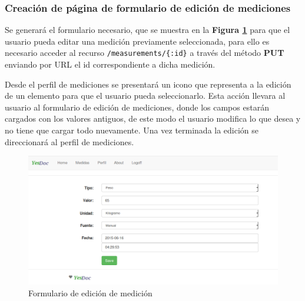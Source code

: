 \subsubsection{ Creación de página de formulario de edición de mediciones}
Se generará el formulario necesario, que se muestra en la \textbf{Figura \ref{editar_medicion}} para que el usuario pueda editar una medición previamente seleccionada, para ello es necesario acceder al recurso \texttt{/measurements/\{:id\}} a través del método \textbf{PUT} enviando por URL el id correspondiente a dicha medición. 

Desde el perfil de mediciones se presentará un icono que representa a la edición de un elemento para que el usuario pueda seleccionarlo. Esta acción llevara al usuario al formulario de edición de mediciones, donde los campos estarán cargados con los valores antiguos, de este modo el usuario modifica lo que desea y no tiene que cargar todo nuevamente. Una vez terminada la edición se direccionará al perfil de mediciones.

	\begin{figure}[h]
        \centering
        \includegraphics[width=1\textwidth]{img/2-editar_medicion}
        \caption{Formulario de edición de medición}
		\label{editar_medicion}
    \end{figure}
    

